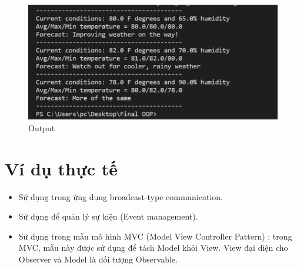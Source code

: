 \begin{figure}[!htb]
    \centering
    \includegraphics[width=\textwidth]{fig/Observer/observer_output.png}
    \caption{Output}
    \label{fig:observer_output}
\end{figure}

\section{Ví dụ thực tế}
\begin{itemize}
    \item Sử dụng trong ứng dụng broadcast-type communication.
    \item Sử dụng để quản lý sự kiện (Event management).
    \item Sử dụng trong mẫu mô hình MVC (Model View Controller Pattern) : trong MVC, mẫu này được sử dụng để tách Model khỏi View. View đại diện cho Observer và Model là đối tượng Observable.
\end{itemize}
 




